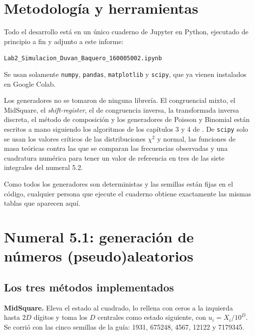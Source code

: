 \documentclass[11pt,letterpaper]{article}
\newcommand{\codigoEstudiante}{160005002}
\begin{document}
\section{Metodología y herramientas}

Todo el desarrollo está en un único cuaderno de Jupyter en Python, ejecutado de principio a fin y
adjunto a este informe:

\begin{center}
\texttt{Lab2\_Simulacion\_Duvan\_Baquero\_\codigoEstudiante.ipynb}
\end{center}

Se usan solamente \texttt{numpy}, \texttt{pandas}, \texttt{matplotlib} y \texttt{scipy}, que ya
vienen instalados en Google Colab.

Los generadores no se tomaron de ninguna librería. El congruencial mixto, el MidSquare, el
\emph{shift-register}, el de congruencia inversa, la transformada inversa discreta, el método de
composición y los generadores de Poisson y Binomial están escritos a mano siguiendo los algoritmos de
los capítulos 3 y 4 de \cite{ross99}. De \texttt{scipy} solo se usan los valores críticos de las
distribuciones $\chi^2$ y normal, las funciones de masa teóricas contra las que se comparan las
frecuencias observadas y una cuadratura numérica para tener un valor de referencia en tres de las
siete integrales del numeral 5.2.

Como todos los generadores son deterministas y las semillas están fijas en el código, cualquier
persona que ejecute el cuaderno obtiene exactamente las mismas tablas que aparecen aquí.

\section{Numeral 5.1: generación de números (pseudo)aleatorios}

\subsection{Los tres métodos implementados}

\textbf{MidSquare.} Eleva el estado al cuadrado, lo rellena con ceros a la izquierda hasta $2D$
dígitos y toma los $D$ centrales como estado siguiente, con $u_i = X_i/10^{D}$. Se corrió con las
cinco semillas de la guía: 1931, 675248, 4567, 12122 y 7179345.
\end{document}
